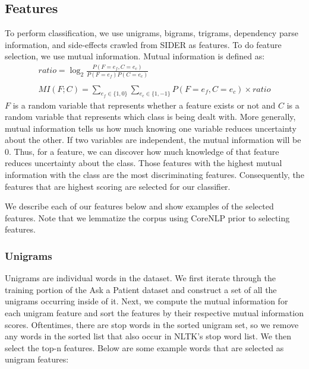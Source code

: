 \documentclass{acm_proc_article-sp}
\begin{document}
\subsection{Features}
To perform classification, we use unigrams, bigrams, trigrams, dependency parse information, and side-effects crawled from SIDER as features. To do feature selection, we use mutual information. Mutual information is defined as: 
\begin{gather*}
ratio = \log_{2} \frac{P(F=e_f,C=e_c)}{P(F=e_f)P(C=e_c)} \\ \\
MI(F;C) = \sum\limits_{e_f \in \{1,0\}} \sum\limits_{e_c \in \{1,-1\}}P(F=e_f,C=e_c) \times ratio
\end{gather*}
$F$ is a random variable that represents whether a feature exists or not and $C$ is a random variable that represents which class is being dealt with. More generally, mutual information tells us how much knowing one variable reduces uncertainty about the other. If two variables are independent, the mutual information will be 0. Thus, for a feature, we can discover how much knowledge of that feature reduces uncertainty about the class. Those features with the highest mutual information with the class are the most discriminating features. Consequently, the features that are highest scoring are selected for our classifier.

We describe each of our features below and show examples of the selected features. Note that we lemmatize the corpus using CoreNLP prior to selecting features.

\subsubsection{Unigrams}
Unigrams are individual words in the dataset. We first iterate through the training portion of the Ask a Patient dataset and construct a set of all the unigrams occurring inside of it. Next, we compute the mutual information for each unigram feature and sort the features by their respective mutual information scores. Oftentimes, there are stop words in the sorted unigram set, so we remove any words in the sorted list that also occur in NLTK's stop word list. We then select the top-n features. Below are some example words that are selected as unigram features: 

\noindent{} 
\end{document}
